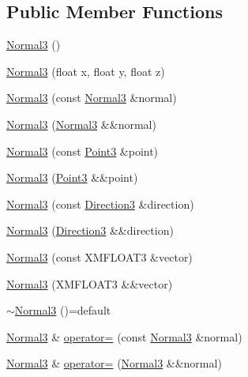 \subsection*{Public Member Functions}
\begin{DoxyCompactItemize}
\item 
\hyperlink{structmage_1_1_normal3_a66ec99f0de4f8231f747e37a4da65cc4}{Normal3} ()
\item 
\hyperlink{structmage_1_1_normal3_a59094c1f96a9721cd8846c5c6ec06f93}{Normal3} (float x, float y, float z)
\item 
\hyperlink{structmage_1_1_normal3_ada9c762e16b51177f3fc1aa6d5310b20}{Normal3} (const \hyperlink{structmage_1_1_normal3}{Normal3} \&normal)
\item 
\hyperlink{structmage_1_1_normal3_ab230659472ea5048c881beb5168e0ad3}{Normal3} (\hyperlink{structmage_1_1_normal3}{Normal3} \&\&normal)
\item 
\hyperlink{structmage_1_1_normal3_a1a58b2fcb3920ff68007257ae6434273}{Normal3} (const \hyperlink{structmage_1_1_point3}{Point3} \&point)
\item 
\hyperlink{structmage_1_1_normal3_a37721c22caefb4d7ec421bed83f3a6c7}{Normal3} (\hyperlink{structmage_1_1_point3}{Point3} \&\&point)
\item 
\hyperlink{structmage_1_1_normal3_a0942e7aace8354f0a414f77ccf90b69c}{Normal3} (const \hyperlink{structmage_1_1_direction3}{Direction3} \&direction)
\item 
\hyperlink{structmage_1_1_normal3_a3799d741c08159f26f5ae13b2df98c56}{Normal3} (\hyperlink{structmage_1_1_direction3}{Direction3} \&\&direction)
\item 
\hyperlink{structmage_1_1_normal3_a61565f1183535666a2fb5183b83bebd2}{Normal3} (const X\+M\+F\+L\+O\+A\+T3 \&vector)
\item 
\hyperlink{structmage_1_1_normal3_a36d104fdbec6251dd2ac44ea77f93c0f}{Normal3} (X\+M\+F\+L\+O\+A\+T3 \&\&vector)
\item 
\hyperlink{structmage_1_1_normal3_a3384b2970fd85fe729514ce0686b4446}{$\sim$\+Normal3} ()=default
\item 
\hyperlink{structmage_1_1_normal3}{Normal3} \& \hyperlink{structmage_1_1_normal3_ade86357989ceaecf1b22bb9e53ca7fed}{operator=} (const \hyperlink{structmage_1_1_normal3}{Normal3} \&normal)
\item 
\hyperlink{structmage_1_1_normal3}{Normal3} \& \hyperlink{structmage_1_1_normal3_a74cd3988b2ee23a0a76a5f7d6d5d7f3f}{operator=} (\hyperlink{structmage_1_1_normal3}{Normal3} \&\&normal)
\end{DoxyCompactItemize}


